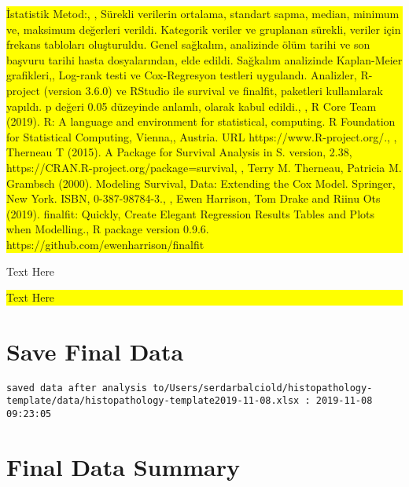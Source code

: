 \documentclass[]{article}
\begin{document}
\noindent

\colorbox{yellow}{
\parbox{\dimexpr\linewidth-2\fboxsep}{

İstatistik Metod:, , Sürekli verilerin ortalama, standart sapma, median, minimum ve, maksimum değerleri verildi. Kategorik veriler ve gruplanan sürekli, veriler için frekans tabloları oluşturuldu. Genel sağkalım, analizinde ölüm tarihi ve son başvuru tarihi hasta dosyalarından, elde edildi.  Sağkalım analizinde Kaplan-Meier grafikleri,, Log-rank testi ve Cox-Regresyon testleri uygulandı. Analizler, R-project (version 3.6.0) ve RStudio ile survival ve finalfit, paketleri kullanılarak yapıldı. p değeri 0.05 düzeyinde anlamlı, olarak kabul edildi., , R Core Team (2019). R: A language and environment for statistical, computing. R Foundation for Statistical Computing, Vienna,, Austria. URL https://www.R-project.org/., , Therneau T (2015). A Package for Survival Analysis in S. version, 2.38, https://CRAN.R-project.org/package=survival, , Terry M. Therneau, Patricia M. Grambsch (2000). Modeling Survival, Data: Extending the Cox Model. Springer, New York. ISBN, 0-387-98784-3., , Ewen Harrison, Tom Drake and Riinu Ots (2019). finalfit: Quickly, Create Elegant Regression Results Tables and Plots when Modelling., R package version 0.9.6. https://github.com/ewenharrison/finalfit

}
}

Text Here

\noindent

\colorbox{yellow}{
\parbox{\dimexpr\linewidth-2\fboxsep}{

Text Here

}
}

\hypertarget{save-final-data}{%
\section{Save Final Data}\label{save-final-data}}

\begin{verbatim}
saved data after analysis to/Users/serdarbalciold/histopathology-template/data/histopathology-template2019-11-08.xlsx : 2019-11-08 09:23:05
\end{verbatim}

\pagebreak

\hypertarget{final-data-summary}{%
\section{Final Data Summary}\label{final-data-summary}}
\end{document}
